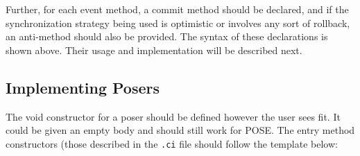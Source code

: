 \documentclass[10pt]{article}
\begin{document}
~\\
\\

Further, for each event method, a commit method should be declared,
and if the synchronization strategy being used is optimistic or
involves any sort of rollback, an anti-method should also be provided.
The syntax of these declarations is shown above.  Their usage and
implementation will be described next.

\subsection{Implementing Posers}

The void constructor for a poser should be defined however the user
sees fit.  It could be given an empty body and should still work for
POSE.  The entry method constructors (those described in the {\tt .ci}
file should follow the template below:

~\\
\\
\end{document}
